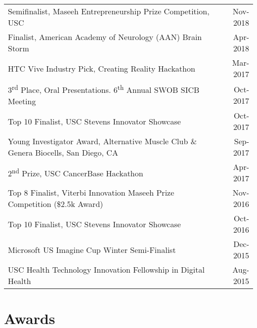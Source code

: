 \documentclass[10pt,a4paper]{article}
\newcommand{\ts}{\textsuperscript}
\begin{document}
  \vspace*{1mm}\noindent\begin{tabularx}{17cm}{X r}
    Semifinalist, Maseeh Entrepreneurship Prize Competition, USC & Nov-2018 \\ %
    Finalist, American Academy of Neurology (AAN) Brain Storm & Apr-2018 \\%
    HTC Vive Industry Pick, Creating Reality Hackathon & Mar-2017 \\%
    3\ts{rd} Place, Oral Presentations. 6\ts{th} Annual SWOB SICB Meeting & Oct-2017\\ %
    Top 10 Finalist, USC Stevens Innovator Showcase & Oct-2017 \\%
    Young Investigator Award, Alternative Muscle Club \& Genera Biocells, San Diego, CA & Sep-2017\\ %
    2\ts{nd} Prize, USC CancerBase Hackathon & Apr-2017 \\ %
    Top 8 Finalist, Viterbi Innovation Maseeh Prize Competition (\$2.5k Award) & Nov-2016 \\ %
    Top 10 Finalist, USC Stevens Innovator Showcase & Oct-2016 \\ %
    Microsoft US Imagine Cup Winter Semi-Finalist & Dec-2015 \\
    USC Health Technology Innovation Fellowship in Digital Health & Aug-2015\\

  \end{tabularx}

\vspace*{2mm}\section*{Awards}
  
\end{document}
